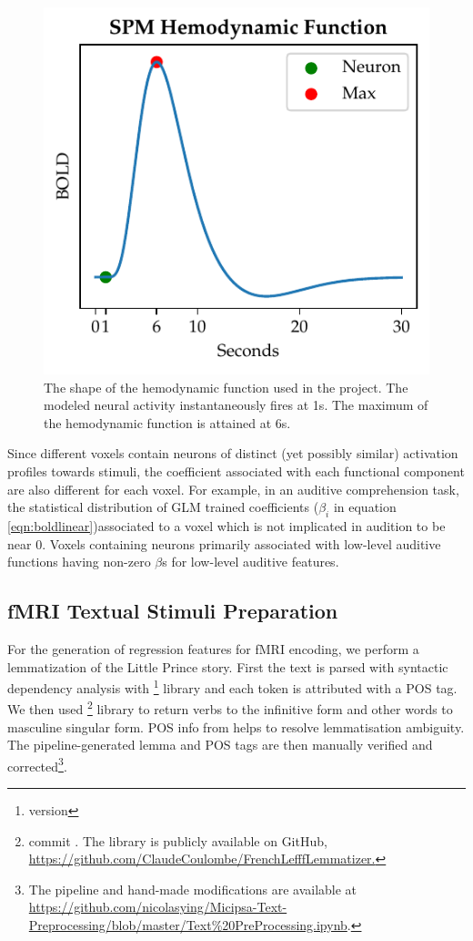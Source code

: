\begin{figure}
    \centering
    \includegraphics[scale=.8]{Figures/SPMHDF.pdf}
    \caption[SPM Hemodynamic Function]{The shape of the hemodynamic function used in the project. The modeled neural activity instantaneously fires at 1s. The maximum of the hemodynamic function is attained at 6s.}
    \label{fig:hrf}
\end{figure}


Since different voxels contain neurons of distinct (yet possibly similar) activation profiles towards stimuli, the coefficient associated with each functional component are also different for each voxel. For example, in an auditive comprehension task, the statistical distribution of GLM trained coefficients (\(\beta_{i}\) in equation \ref{eqn:boldlinear})associated to a voxel which is not implicated in audition to be near 0. Voxels containing neurons primarily associated with low-level auditive functions having non-zero \(\beta\)s for low-level auditive features.

\subsection{fMRI Textual Stimuli Preparation} 

For the generation of regression features for fMRI encoding, we perform a lemmatization of the Little Prince story. First the text is parsed with syntactic dependency analysis with \footnote{version } library and each token is attributed with a POS tag. We then used \footnote{commit . The library is publicly available on GitHub, \url{https://github.com/ClaudeCoulombe/FrenchLefffLemmatizer.}}\parencite{sagotLefffFreelyAvailable2010} library to return verbs to the infinitive form and other words to masculine singular form. POS info from  helps to resolve lemmatisation ambiguity. The pipeline-generated lemma and POS tags are then manually verified and corrected\footnote{The pipeline and hand-made modifications are available at \url{https://github.com/nicolasying/Micipsa-Text-Preprocessing/blob/master/Text\%20PreProcessing.ipynb}.}.

